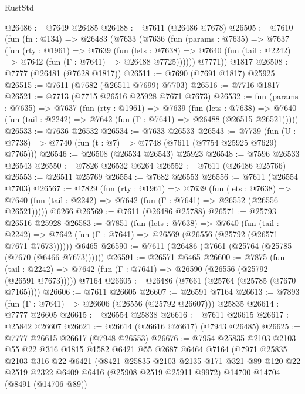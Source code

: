 \begin{lexlean}{RustStd}
\begin{coremodule}
@26486 := @7649 @26485
@26488 := @7611 (@26486 @7678)
@26505 := @7610
    (fun (fn : @134) =>
    @26483
      (@7633
        (@7636
          (fun (params : @7635) =>
          @7637
            (fun (rty : @1961) =>
            @7639
              (fun (lets : @7638) =>
              @7640 (fun (tail : @2242) => @7642 (fun (Γ : @7641) => @26488 @7725))))))
        @7771))
    @1817
@26508 := @7777 (@26481 (@7628 @1817))
@26511 := @7690 (@7691 @1817) @25925
@26515 := @7611 (@7682 (@26511 @7699) @7703)
@26516 := @7716 @1817
@26521 := @7713 (@7715 @26516 @25928 @7671 @7673)
@26532 := fun (params : @7635) =>
  @7637
    (fun (rty : @1961) =>
    @7639
      (fun (lets : @7638) =>
      @7640 (fun (tail : @2242) => @7642 (fun (Γ : @7641) => @26488 (@26515 @26521)))))
@26533 := @7636 @26532
@26534 := @7633 @26533
@26543 := @7739
    (fun (U : @7738) => @7740 (fun (t : @7) => @7748 (@7611 (@7754 @25925 @7629) @7765)))
@26546 := @26508 (@26534 @26543) @25923
@26548 := @7596 @26533 @26543
@26550 := @7826 @26532 @6264
@26552 := @7611 (@26486 @25766)
@26553 := @26511 @25769
@26554 := @7682 @26553
@26556 := @7611 (@26554 @7703)
@26567 := @7829
    (fun (rty : @1961) =>
    @7639
      (fun (lets : @7638) =>
      @7640 (fun (tail : @2242) => @7642 (fun (Γ : @7641) => @26552 (@26556 @26521)))))
    @6266
@26569 := @7611 (@26486 @25788)
@26571 := @25793 @26516 @25928
@26583 := @7851
    (fun (lets : @7638) =>
    @7640
      (fun (tail : @2242) =>
      @7642 (fun (Γ : @7641) => @26569 (@26556 (@25792 (@26571 @7671 @7673))))))
    @6465
@26590 := @7611 (@26486 (@7661 (@25764 (@25785 (@7670 (@6466 @7673))))))
@26591 := @26571 @6465
@26600 := @7875
    (fun (tail : @2242) => @7642 (fun (Γ : @7641) => @26590 (@26556 (@25792 (@26591 @7673)))))
    @7164
@26605 := @26486 (@7661 (@25764 (@25785 (@7670 @7165))))
@26606 := @7611 @26605
@26607 := @26591 @7164
@26613 := @7893 (fun (Γ : @7641) => @26606 (@26556 (@25792 @26607))) @25835
@26614 := @7777 @26605
@26615 := @26554 @25838
@26616 := @7611 @26615
@26617 := @25842 @26607
@26621 := @26614 (@26616 @26617) (@7943 @26485)
@26625 := @7777 @26615 @26617 (@7948 @26553)
@26676 := @7954
    @25835
    @2103
    @2103
    @55
    @22
    @316
    @1815
    @1582
    @6421
    @55
    @2687
    @6464
    @7164
    (@7971
      @25835
      @2103
      @316
      @22
      @6421
      (@8421
        @25835
        @2103
        @2135
        @171
        @321
        @89
        @120
        @22
        @2519
        @2322
        @6409
        @6416
        (@25908 @2519 @25911 @9972)
        @14700
        @14704
        (@8491 (@14706 @89))

\end{coremodule}
\end{lexlean}
